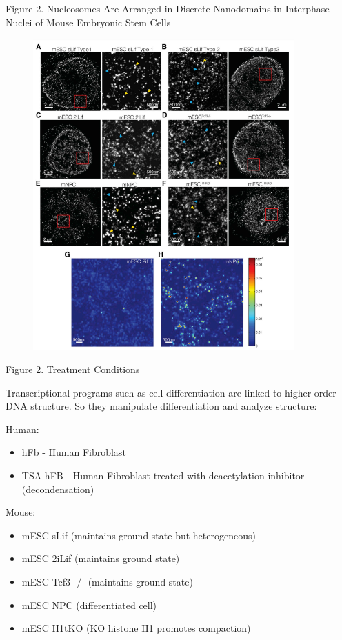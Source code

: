 \documentclass{beamer}			%
\begin{document}
\begin{frame}{Figure 2. Nucleosomes Are Arranged in Discrete Nanodomains in Interphase Nuclei of Mouse Embryonic Stem Cells}
\begin{figure}
\includegraphics[width=10cm]{Figure-2.png}
\end{figure}
\end{frame}


\begin{frame}{Figure 2. Treatment Conditions}

Transcriptional programs such as cell differentiation are linked to higher order DNA structure. So they manipulate differentiation and analyze structure:

\vspace{0.2in}

Human: 
\begin{itemize}
\item hFb - Human Fibroblast
\item TSA hFB - Human Fibroblast treated with deacetylation inhibitor (decondensation)
\end{itemize}

Mouse:
\begin{itemize}
\item {mESC sLif (maintains ground state but heterogeneous)}
\item {mESC 2iLif (maintains ground state)}
\item {mESC Tcf3 -/- (maintains ground state)}
\item {mESC NPC (differentiated cell)}
\item {mESC H1tKO (KO histone H1 promotes compaction) }
\end{itemize}
\end{frame}
\end{document}
